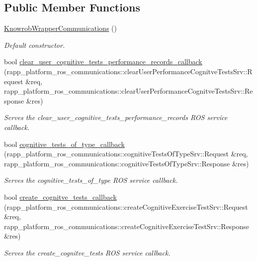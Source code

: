\subsection*{Public Member Functions}
\begin{DoxyCompactItemize}
\item 
\hyperlink{classKnowrobWrapperCommunications_aa796e3e743aa06c6fd0153cfe4863abd}{Knowrob\-Wrapper\-Communications} ()
\begin{DoxyCompactList}\small\item\em Default constructor. \end{DoxyCompactList}\item 
bool \hyperlink{classKnowrobWrapperCommunications_ad7fae0d25d1f657a5f40df8a4985fb15}{clear\-\_\-user\-\_\-cognitive\-\_\-tests\-\_\-performance\-\_\-records\-\_\-callback} (rapp\-\_\-platform\-\_\-ros\-\_\-communications\-::clear\-User\-Performance\-Cognitve\-Tests\-Srv\-::\-Request \&req, rapp\-\_\-platform\-\_\-ros\-\_\-communications\-::clear\-User\-Performance\-Cognitve\-Tests\-Srv\-::\-Response \&res)
\begin{DoxyCompactList}\small\item\em Serves the clear\-\_\-user\-\_\-cognitive\-\_\-tests\-\_\-performance\-\_\-records R\-O\-S service callback. \end{DoxyCompactList}\item 
bool \hyperlink{classKnowrobWrapperCommunications_a9c598f55161da568022fa1da1406f7e5}{cognitive\-\_\-tests\-\_\-of\-\_\-type\-\_\-callback} (rapp\-\_\-platform\-\_\-ros\-\_\-communications\-::cognitive\-Tests\-Of\-Type\-Srv\-::\-Request \&req, rapp\-\_\-platform\-\_\-ros\-\_\-communications\-::cognitive\-Tests\-Of\-Type\-Srv\-::\-Response \&res)
\begin{DoxyCompactList}\small\item\em Serves the cognitive\-\_\-tests\-\_\-of\-\_\-type R\-O\-S service callback. \end{DoxyCompactList}\item 
bool \hyperlink{classKnowrobWrapperCommunications_af2addeace661115f731721be3a326d8d}{create\-\_\-cognitve\-\_\-tests\-\_\-callback} (rapp\-\_\-platform\-\_\-ros\-\_\-communications\-::create\-Cognitive\-Exercise\-Test\-Srv\-::\-Request \&req, rapp\-\_\-platform\-\_\-ros\-\_\-communications\-::create\-Cognitive\-Exercise\-Test\-Srv\-::\-Response \&res)
\begin{DoxyCompactList}\small\item\em Serves the create\-\_\-cognitve\-\_\-tests R\-O\-S service callback. \end{DoxyCompactList}\item 

\end{DoxyCompactItemize}
